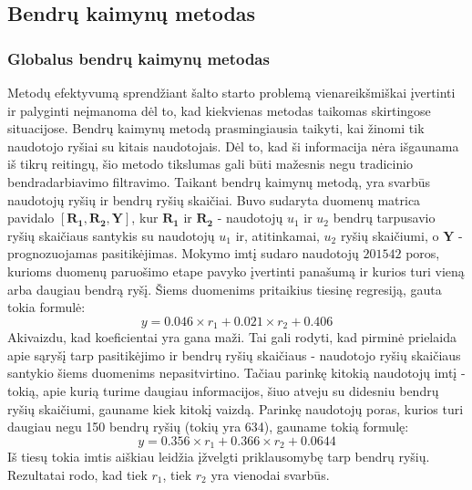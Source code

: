 \documentclass{VUMIFInfMagistrinis}
\begin{document}
\subsection{Bendrų kaimynų metodas}
\subsubsection{Globalus bendrų kaimynų metodas}
\indent
Metodų efektyvumą sprendžiant šalto starto problemą vienareikšmiškai įvertinti ir palyginti neįmanoma dėl to, kad kiekvienas metodas taikomas skirtingose situacijose. Bendrų kaimynų metodą prasmingiausia taikyti, kai žinomi tik naudotojo ryšiai su kitais naudotojais. Dėl to, kad ši informacija nėra išgaunama iš tikrų reitingų, šio metodo tikslumas gali būti mažesnis negu tradicinio bendradarbiavimo filtravimo.
\newline
\indent
Taikant bendrų kaimynų metodą, yra svarbūs naudotojų ryšių ir bendrų ryšių skaičiai. Buvo sudaryta duomenų matrica pavidalo $[ \boldsymbol{R_1}, \boldsymbol{R_2},  \boldsymbol{Y}]$, kur $\boldsymbol{R_1}$ ir $\boldsymbol{R_2}$ - naudotojų $u_1$ ir $u_2$ bendrų tarpusavio ryšių skaičiaus santykis su naudotojų $u_1$ ir, atitinkamai, $u_2$ ryšių skaičiumi, o $\boldsymbol{Y}$ - prognozuojamas pasitikėjimas. Mokymo imtį sudaro naudotojų $201542$ poros, kurioms duomenų paruošimo etape pavyko įvertinti panašumą ir kurios turi vieną arba daugiau bendrą ryšį. Šiems duomenims pritaikius tiesinę regresiją, gauta tokia formulė:
\begin{equation}\label{eq:CN_all}
y = 0.046 \times r_1 + 0.021 \times r_2 + 0.406
\end{equation}
Akivaizdu, kad koeficientai yra gana maži. Tai gali rodyti, kad pirminė prielaida apie sąryšį tarp pasitikėjimo ir bendrų ryšių skaičiaus - naudotojo ryšių skaičiaus santykio šiems duomenims nepasitvirtino. Tačiau parinkę kitokią naudotojų imtį - tokią, apie kurią turime daugiau informacijos, šiuo atveju su didesniu bendrų ryšių skaičiumi, gauname kiek kitokį vaizdą. Parinkę naudotojų poras, kurios turi daugiau negu 150 bendrų ryšių (tokių yra 634), gauname tokią formulę:
\begin{equation}\label{eq:CN_150}
y = 0.356 \times r_1 + 0.366 \times r_2 + 0.0644
\end{equation}
\newline
Iš tiesų tokia imtis aiškiau leidžia įžvelgti priklausomybę tarp bendrų ryšių. Rezultatai rodo, kad tiek $r_1$, tiek $r_2$ yra vienodai svarbūs.
\indent
\end{document}
